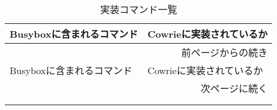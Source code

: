 \begin{longtable}{lp{50mm}}
  \caption{実装コマンド一覧}
  \label{table:command} \\
  \hline
  Busyboxに含まれるコマンド & Cowrieに実装されているか \\ \hline\hline
  \endfirsthead
  \multicolumn{2}{r}{前ページからの続き} \\ \hline
  Busyboxに含まれるコマンド & Cowrieに実装されているか \\ \hline\hline
  \endhead
  \hline
  \multicolumn{2}{r}{次ページに続く} \\
  \endfoot
  \hline
  \multicolumn{2}{r}{以上} \\
  \endlastfoot


\end{longtable}
